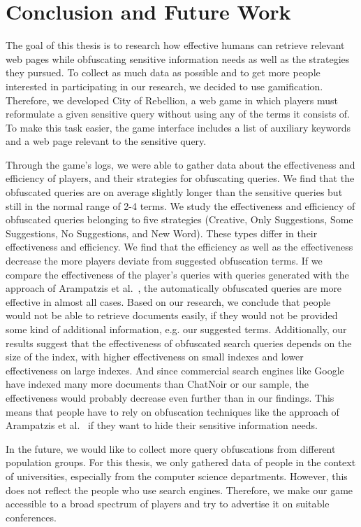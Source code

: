 \chapter{Conclusion and Future Work}
The goal of this thesis is to research how effective humans can retrieve relevant web pages while obfuscating sensitive information needs as well as the strategies they pursued. To collect as much data as possible and to get more people interested in participating in our research, we decided to use gamification. Therefore, we developed City of Rebellion, a web game in which players must reformulate a given sensitive query without using any of the terms it consists of. To make this task easier, the game interface includes a list of auxiliary keywords and a web page relevant to the sensitive query.\par
Through the game's logs, we were able to gather data about the effectiveness and efficiency of players, and their strategies for obfuscating queries. We find that the obfuscated queries are on average slightly longer than the sensitive queries but still in the normal range of 2-4 terms. We study the effectiveness and efficiency of obfuscated queries belonging to five strategies (Creative, Only Suggestions, Some Suggestions, No Suggestions, and New Word). These types differ in their effectiveness and efficiency. We find that the efficiency as well as the effectiveness decrease the more players deviate from suggested obfuscation terms. If we compare the effectiveness of the player's queries with queries generated with the approach of Arampatzis et al.~\cite{arampatzis}, the automatically obfuscated queries are more effective in almost all cases.
Based on our research, we conclude that people would not be able to retrieve documents easily, if they would not be provided some kind of additional information, e.g. our suggested terms. Additionally, our results suggest that the effectiveness of obfuscated search queries depends on the size of the index, with higher effectiveness on small indexes and lower effectiveness on large indexes. 
And since commercial search engines like Google have indexed many more documents than ChatNoir or our sample, the effectiveness would probably decrease even further than in our findings.
This means that people have to rely on obfuscation techniques like the approach of Arampatzis et al.~\cite{arampatzis} if they want to hide their sensitive information needs.\par
In the future, we would like to collect more query obfuscations from different population groups. For this thesis, we only gathered data of people in the context of universities, especially from the computer science departments. However, this does not reflect the people who use search engines. Therefore, we make our game accessible to a broad spectrum of players and try to advertise it on suitable conferences. 
